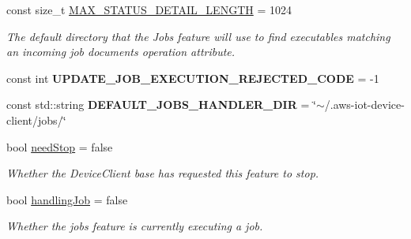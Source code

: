 \begin{DoxyCompactItemize}
const size\+\_\+t \hyperlink{class_aws_1_1_iot_1_1_device_client_1_1_jobs_1_1_jobs_feature_a3f0629514f8a97930ded3e64aae5f952}{M\+A\+X\+\_\+\+S\+T\+A\+T\+U\+S\+\_\+\+D\+E\+T\+A\+I\+L\+\_\+\+L\+E\+N\+G\+TH} = 1024
\begin{DoxyCompactList}\small\item\em The default directory that the Jobs feature will use to find executables matching an incoming job document\textquotesingle{}s operation attribute. \end{DoxyCompactList}\item 
\mbox{\label{class_aws_1_1_iot_1_1_device_client_1_1_jobs_1_1_jobs_feature_a2a626ee75dcbf527b70ea572b2bcfa82}} 
const int {\bfseries U\+P\+D\+A\+T\+E\+\_\+\+J\+O\+B\+\_\+\+E\+X\+E\+C\+U\+T\+I\+O\+N\+\_\+\+R\+E\+J\+E\+C\+T\+E\+D\+\_\+\+C\+O\+DE} = -\/1
\item 
\mbox{\label{class_aws_1_1_iot_1_1_device_client_1_1_jobs_1_1_jobs_feature_a22e3bd36ee066ec60907ddb725a6c643}} 
const std\+::string {\bfseries D\+E\+F\+A\+U\+L\+T\+\_\+\+J\+O\+B\+S\+\_\+\+H\+A\+N\+D\+L\+E\+R\+\_\+\+D\+IR} = \char`\"{}$\sim$/.aws-\/iot-\/device-\/client/jobs/\char`\"{}
\item 
\mbox{\label{class_aws_1_1_iot_1_1_device_client_1_1_jobs_1_1_jobs_feature_accbc5327b89ebfb18643bf9f6fd9d04c}} 
bool \hyperlink{class_aws_1_1_iot_1_1_device_client_1_1_jobs_1_1_jobs_feature_accbc5327b89ebfb18643bf9f6fd9d04c}{need\+Stop} = false
\begin{DoxyCompactList}\small\item\em Whether the Device\+Client base has requested this feature to stop. \end{DoxyCompactList}\item 
\mbox{\label{class_aws_1_1_iot_1_1_device_client_1_1_jobs_1_1_jobs_feature_a2e4e736a9fb9a2ade61c0aad2c1e3ff6}} 
bool \hyperlink{class_aws_1_1_iot_1_1_device_client_1_1_jobs_1_1_jobs_feature_a2e4e736a9fb9a2ade61c0aad2c1e3ff6}{handling\+Job} = false
\begin{DoxyCompactList}\small\item\em Whether the jobs feature is currently executing a job. \end{DoxyCompactList}\item 

\end{DoxyCompactItemize}
